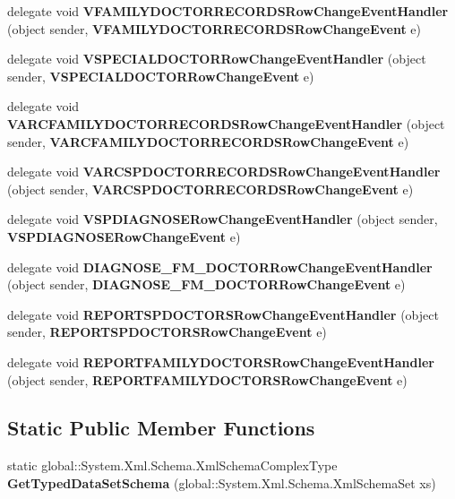 \begin{CompactItemize}
\item 
delegate void \textbf{VFAMILYDOCTORRECORDSRowChangeEventHandler} (object sender, {\bf VFAMILYDOCTORRECORDSRowChangeEvent} e)\label{class_automatic_medical_system_1_1_data_set1_2a004fc6372354f2e3c3a03ba1d112dc}

\item 
delegate void \textbf{VSPECIALDOCTORRowChangeEventHandler} (object sender, {\bf VSPECIALDOCTORRowChangeEvent} e)\label{class_automatic_medical_system_1_1_data_set1_b4f9c0d545a9c6390af558d8fd0a6919}

\item 
delegate void \textbf{VARCFAMILYDOCTORRECORDSRowChangeEventHandler} (object sender, {\bf VARCFAMILYDOCTORRECORDSRowChangeEvent} e)\label{class_automatic_medical_system_1_1_data_set1_6bc1dceb073160bbba3b4ebf050f79c3}

\item 
delegate void \textbf{VARCSPDOCTORRECORDSRowChangeEventHandler} (object sender, {\bf VARCSPDOCTORRECORDSRowChangeEvent} e)\label{class_automatic_medical_system_1_1_data_set1_6a6fd533140fb749ddd8d073bfcde33d}

\item 
delegate void \textbf{VSPDIAGNOSERowChangeEventHandler} (object sender, {\bf VSPDIAGNOSERowChangeEvent} e)\label{class_automatic_medical_system_1_1_data_set1_73da990a33ecc13cf96bd1b95990bd6a}

\item 
delegate void \textbf{DIAGNOSE\_\-FM\_\-DOCTORRowChangeEventHandler} (object sender, {\bf DIAGNOSE\_\-FM\_\-DOCTORRowChangeEvent} e)\label{class_automatic_medical_system_1_1_data_set1_4d0395e09ffcaa652e994116428730d6}

\item 
delegate void \textbf{REPORTSPDOCTORSRowChangeEventHandler} (object sender, {\bf REPORTSPDOCTORSRowChangeEvent} e)\label{class_automatic_medical_system_1_1_data_set1_524599a47fee02d7e28b3d2a5372a41f}

\item 
delegate void \textbf{REPORTFAMILYDOCTORSRowChangeEventHandler} (object sender, {\bf REPORTFAMILYDOCTORSRowChangeEvent} e)\label{class_automatic_medical_system_1_1_data_set1_742d190a5f239575d1322d5c4f13eb7f}

\end{CompactItemize}
\subsection*{Static Public Member Functions}
\begin{CompactItemize}
\item 
static global::System.Xml.Schema.XmlSchemaComplexType \textbf{GetTypedDataSetSchema} (global::System.Xml.Schema.XmlSchemaSet xs)\label{class_automatic_medical_system_1_1_data_set1_d0c136f186f6105525f0a3fd47943e85}

\end{CompactItemize}
